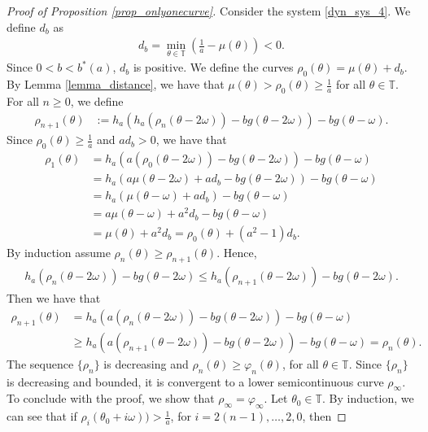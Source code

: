 \documentclass[12pt]{article}
\newcommand{\T}{\mathbb{T}}
\theoremstyle{plain}
\theoremstyle{remark}
\theoremstyle{definition}
\begin{document}
\begin{proof}[Proof of Proposition \ref{prop_onlyonecurve}]
    Consider the system \eqref{dyn_sys_4}. We define $d_b$ as
    \begin{align*}
        d_b = \min_{\theta\in\T}\left(\frac{1}{a}-\mu(\theta)\right)<0.
    \end{align*}
    Since $0<b<b^*(a)$, $d_b$ is positive. We define the curves $\rho_{0}(\theta) = \mu(\theta)+d_b$. By Lemma \ref{lemma_distance}, we have that $\mu(\theta)>\rho_{0}(\theta)\geq\frac{1}{a}$ for all $\theta\in\T$. For all $n\geq0$, we define
    \begin{align*}
        \rho_{n+1}(\theta) &:= h_a(h_{a}(\rho_n(\theta-2\omega)) - b g(\theta-2\omega)) - b g(\theta-\omega).
    \end{align*}
    Since $\rho_{0}(\theta)\geq\frac{1}{a}$ and $a d_b>0$, we have that
    \begin{align*}
        \rho_{1}(\theta) &= h_a(a(\rho_0(\theta-2\omega)) - b g(\theta-2\omega)) - b g(\theta-\omega)\\
        &= h_a(a\mu(\theta-2\omega) + a d_b - b g(\theta-2\omega)) - b g(\theta-\omega)\\
        &= h_a(\mu(\theta-\omega) +a d_b) - b g(\theta-\omega)\\
        &= a\mu(\theta-\omega) + a^2 d_b - b g(\theta-\omega)\\
        &= \mu(\theta) + a^2 d_b = \rho_0(\theta) + (a^2-1) d_b.
    \end{align*}
    By induction assume $\rho_n(\theta)\geq \rho_{n+1}(\theta)$. Hence,
    \begin{align*}
        h_a(\rho_{n}(\theta-2\omega))- b g(\theta-2\omega) \leq h_a(\rho_{n+1}(\theta-2\omega))- b g(\theta-2\omega).
    \end{align*}
    Then we have that
    \begin{align*}
        \rho_{n+1}(\theta) &= h_a(a(\rho_{n}(\theta-2\omega)) - b g(\theta-2\omega)) - b g(\theta-\omega)\\
        &\geq h_a(a(\rho_{n+1}(\theta-2\omega)) - b g(\theta-2\omega)) - b g(\theta-\omega) = \rho_{n}(\theta).
    \end{align*}
    The sequence $\{\rho_{n}\}$ is decreasing and $\rho_{n}(\theta)\geq\varphi_{n}(\theta)$, for all $\theta\in\T$. 
    Since $\{\rho_{n}\}$ is decreasing and bounded, it is convergent to a lower semicontinuous curve $\rho_\infty$.
    To conclude with the proof, we show that $\rho_\infty=\varphi_\infty$. Let $\theta_0\in\T$. By induction, we can see that if $\rho_{i}(\theta_0+i\omega))>\frac{1}{a}$, for $i=2(n-1),\dots,2,0$, then

\end{proof}
\end{document}
